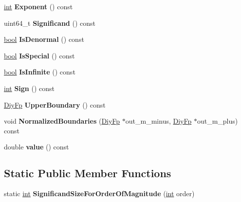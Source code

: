 \begin{DoxyCompactItemize}
\mbox{\hyperlink{classint}{int}} {\bfseries Exponent} () const
\item 
\mbox{\label{classv8_1_1internal_1_1Double_aede431d0ffd7d55e6f3c3c1f1e273e25}} 
uint64\+\_\+t {\bfseries Significand} () const
\item 
\mbox{\label{classv8_1_1internal_1_1Double_a1f1c506885ea6b631f319e5b327a8021}} 
\mbox{\hyperlink{classbool}{bool}} {\bfseries Is\+Denormal} () const
\item 
\mbox{\label{classv8_1_1internal_1_1Double_a8adcf8a9b9469c781bc5ea7025db7e88}} 
\mbox{\hyperlink{classbool}{bool}} {\bfseries Is\+Special} () const
\item 
\mbox{\label{classv8_1_1internal_1_1Double_a36c4c75208a6f52d0793895e949dec65}} 
\mbox{\hyperlink{classbool}{bool}} {\bfseries Is\+Infinite} () const
\item 
\mbox{\label{classv8_1_1internal_1_1Double_afebab2977c741defabab77a2e6cb4385}} 
\mbox{\hyperlink{classint}{int}} {\bfseries Sign} () const
\item 
\mbox{\label{classv8_1_1internal_1_1Double_acb325cb1df31832bbc8224e00363a66d}} 
\mbox{\hyperlink{classv8_1_1internal_1_1DiyFp}{Diy\+Fp}} {\bfseries Upper\+Boundary} () const
\item 
\mbox{\label{classv8_1_1internal_1_1Double_aebc85bf7408cea3c098ecce6eb782ef1}} 
void {\bfseries Normalized\+Boundaries} (\mbox{\hyperlink{classv8_1_1internal_1_1DiyFp}{Diy\+Fp}} $\ast$out\+\_\+m\+\_\+minus, \mbox{\hyperlink{classv8_1_1internal_1_1DiyFp}{Diy\+Fp}} $\ast$out\+\_\+m\+\_\+plus) const
\item 
\mbox{\label{classv8_1_1internal_1_1Double_ae3b019e13ac336e6c4f98776d65285d4}} 
double {\bfseries value} () const
\end{DoxyCompactItemize}
\subsection*{Static Public Member Functions}
\begin{DoxyCompactItemize}
\item 
\mbox{\label{classv8_1_1internal_1_1Double_a8ac372d485499fb0e73db067852254c9}} 
static \mbox{\hyperlink{classint}{int}} {\bfseries Significand\+Size\+For\+Order\+Of\+Magnitude} (\mbox{\hyperlink{classint}{int}} order)
\end{DoxyCompactItemize}
